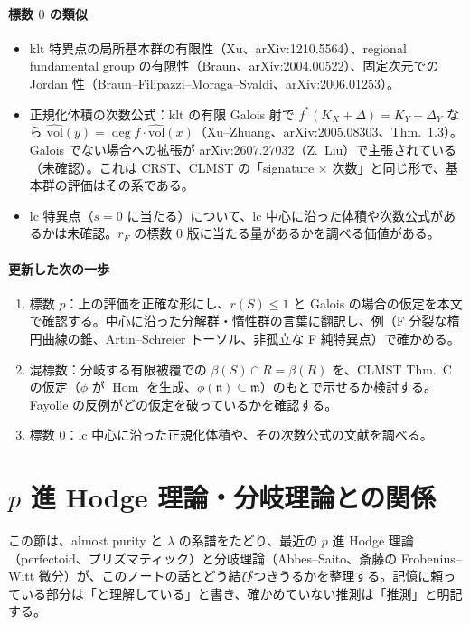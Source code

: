 \documentclass[11pt,a4paper]{ltjsarticle}
\theoremstyle{plain}
\theoremstyle{definition}
\theoremstyle{remark}
\theoremstyle{plain}
\newcommand{\m}{\mathfrak{m}}
\newcommand{\n}{\mathfrak{n}}
\newcommand{\Hom}{\operatorname{Hom}}
\begin{document}
\paragraph{標数 $0$ の類似}
\begin{itemize}
  \item klt 特異点の局所基本群の有限性（Xu、arXiv:1210.5564）、regional fundamental group の有限性（Braun、arXiv:2004.00522）、固定次元での Jordan 性（Braun--Filipazzi--Moraga--Svaldi、arXiv:2006.01253）。
  \item 正規化体積の次数公式：klt の有限 Galois 射で $f^*(K_X+\Delta) = K_Y+\Delta_Y$ なら $\widehat{\mathrm{vol}}(y) = \deg f\cdot\widehat{\mathrm{vol}}(x)$（Xu--Zhuang、arXiv:2005.08303、Thm.~1.3）。Galois でない場合への拡張が arXiv:2607.27032（Z.~Liu）で主張されている（未確認）。これは CRST、CLMST の「signature $\times$ 次数」と同じ形で、基本群の評価はその系である。
  \item lc 特異点（$s = 0$ に当たる）について、lc 中心に沿った体積や次数公式があるかは未確認。$r_F$ の標数 $0$ 版に当たる量があるかを調べる価値がある。
\end{itemize}

\paragraph{更新した次の一歩}
\begin{enumerate}
  \item 標数 $p$：上の評価を正確な形にし、$r(S)\le1$ と Galois の場合の仮定を本文で確認する。中心に沿った分解群・惰性群の言葉に翻訳し、例（F 分裂な楕円曲線の錐、Artin--Schreier トーソル、非孤立な F 純特異点）で確かめる。
  \item 混標数：分岐する有限被覆での $\beta(S)\cap R = \beta(R)$ を、CLMST Thm.~C の仮定（$\phi$ が $\Hom$ を生成、$\phi(\n)\subseteq\m$）のもとで示せるか検討する。Fayolle の反例がどの仮定を破っているかを確認する。
  \item 標数 $0$：lc 中心に沿った正規化体積や、その次数公式の文献を調べる。
\end{enumerate}

\section{$p$ 進 Hodge 理論・分岐理論との関係}\label{sec:padic}

この節は、almost purity と $\lambda$ の系譜をたどり、最近の $p$ 進 Hodge 理論（perfectoid、プリズマティック）と分岐理論（Abbes--Saito、斎藤の Frobenius--Witt 微分）が、このノートの話とどう結びつきうるかを整理する。記憶に頼っている部分は「と理解している」と書き、確かめていない推測は「推測」と明記する。
\end{document}
